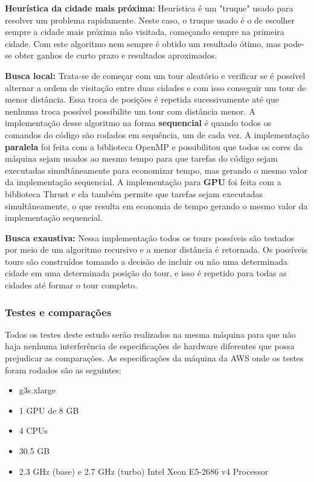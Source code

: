 \documentclass[11pt]{article}
\providecommand{\tightlist}{%
      \setlength{\itemsep}{0pt}\setlength{\parskip}{0pt}}
\begin{document}
\textbf{Heurística da cidade mais próxima:} Heurística é um "truque"
usado para resolver um problema rapidamente. Neste caso, o truque usado
é o de escolher sempre a cidade mais próxima não visitada, começando
sempre na primeira cidade. Com este algoritmo nem sempre é obtido um
resultado ótimo, mas pode-se obter ganhos de curto prazo e resultados
aproximados.

\textbf{Busca local:} Trata-se de começar com um tour aleatório e
verificar se é possível alternar a ordem de visitação entre duas cidades
e com isso conseguir um tour de menor distância. Essa troca de posições
é repetida sucessivamente até que nenhuma troca possível possibilite um
tour com distância menor. A implementação desse algoritmo na forma
\textbf{sequencial} é quando todos os comandos do código são rodados em
sequência, um de cada vez. A implementação \textbf{paralela} foi feita
com a biblioteca OpenMP e possibilitou que todos os cores da máquina
sejam usados ao mesmo tempo para que tarefas do código sejam executadas
simultâneamente para economizar tempo, mas gerando o mesmo valor da
implementação sequencial. A implementação para \textbf{GPU} foi feita
com a biblioteca Thrust e ela também permite que tarefas sejam
executadas simultâneamente, o que resulta em economia de tempo gerando o
mesmo valor da implementação sequencial.

\textbf{Busca exaustiva:} Nessa implementação todos os tours possíveis
são testados por meio de um algoritmo recursivo e a menor distância é
retornada. Os possíveis tours são construídos tomando a decisão de
incluir ou não uma determinada cidade em uma determinada posição do
tour, e isso é repetido para todas as cidades até formar o tour
completo.

\subsubsection{Testes e comparações}\label{testes-e-comparauxe7uxf5es}

Todos os testes deste estudo serão realizados na mesma máquina para que
não haja nenhuma interferência de especificações de hardware diferentes
que possa prejudicar as comparações. As especificações da máquina da AWS
onde os testes foram rodados são as seguintes:

\begin{itemize}
\tightlist
\item
  g3s.xlarge
\item
  1 GPU de 8 GB
\item
  4 CPUs
\item
  30.5 GB
\item
  2.3 GHz (base) e 2.7 GHz (turbo) Intel Xeon E5-2686 v4 Processor
\end{itemize}
\end{document}
